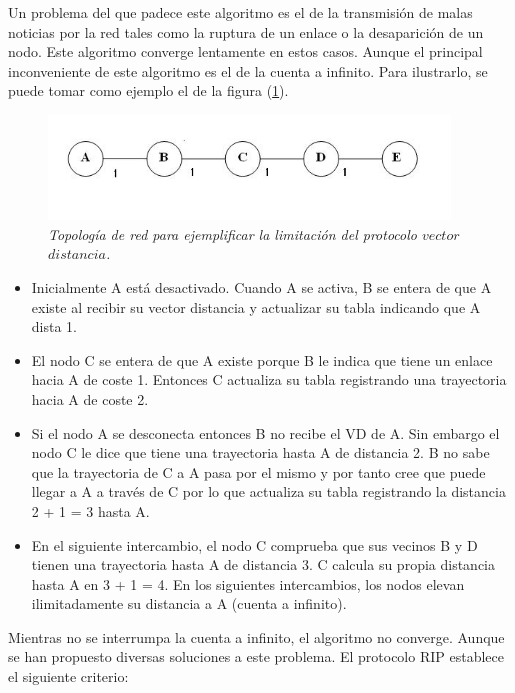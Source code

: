 Un problema del que padece este algoritmo es el de la transmisión de malas noticias por la red tales como la ruptura de un enlace o la desaparición de un nodo. Este algoritmo converge lentamente en estos casos. Aunque el principal inconveniente de este algoritmo es el de la cuenta a infinito. Para ilustrarlo, se puede tomar como ejemplo el de la figura (\ref{figuraVectorDistancia1}).

\begin{figure}[th]	
	\centering	
	\includegraphics[width=0.95\textwidth]{./figures/VectorDistancia1}		
	\caption{\textit{Topología de red para ejemplificar la limitación del protocolo $vector$ $distancia$.}}
	\label{figuraVectorDistancia1}
\end{figure}

\begin{itemize}
\item Inicialmente A está desactivado. Cuando A se activa, B se entera de que A existe al recibir su vector distancia y actualizar su tabla indicando que A dista 1.

\item El nodo C se entera de que A existe porque B le indica que tiene un enlace hacia A de coste 1. Entonces C actualiza su tabla registrando una trayectoria hacia A de coste 2.

\item Si el nodo A se desconecta entonces B no recibe el VD de A. Sin embargo el nodo C le dice que tiene una trayectoria hasta A de distancia 2. B no sabe que la trayectoria de C a A pasa por el mismo y por tanto cree que puede llegar a A a través de C por lo que actualiza su tabla registrando la distancia 2 + 1 = 3 hasta A.

\item En el siguiente intercambio, el nodo C comprueba que sus vecinos B y D tienen una trayectoria hasta A de distancia 3. C calcula su propia distancia hasta A en 3 + 1 = 4. En los siguientes intercambios, los nodos elevan ilimitadamente su distancia a A (cuenta a infinito).
\end{itemize}

Mientras no se interrumpa la cuenta a infinito, el algoritmo no converge. Aunque se han propuesto diversas soluciones a este problema. El protocolo RIP establece el siguiente criterio:

